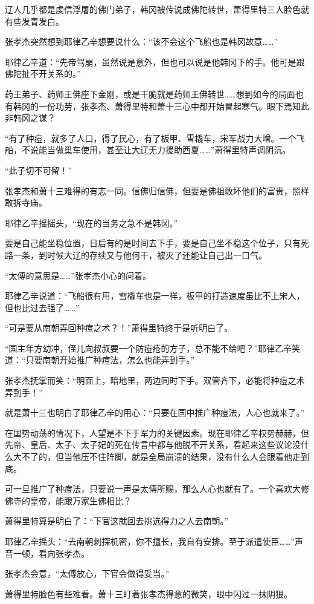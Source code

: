 辽人几乎都是虔信浮屠的佛门弟子，韩冈被传说成佛陀转世，萧得里特三人脸色就有些发青发白。

张孝杰突然想到耶律乙辛想要说什么：“该不会这个飞船也是韩冈故意……”

耶律乙辛道：“先帝驾崩，虽然说是意外，但也可以说是他韩冈下的手。他可是跟佛陀扯不开关系的。”

药王弟子、药师王佛座下金刚，或是干脆就是药师王佛转世……想到如今的局面也有韩冈的一份功劳，张孝杰、萧得里特和萧十三心中都开始冒起寒气。眼下焉知此非韩冈之谋？

“有了种痘，就多了人口，得了民心，有了板甲、雪橇车，宋军战力大增。一个飞船，不说能当做巢车使用，甚至让大辽无力援助西夏……”萧得里特声调阴沉。

“此子切不可留！”

张孝杰和萧十三难得的有志一同。信佛归信佛，但要是佛祖敢坏他们的富贵，照样敢拆寺庙。

耶律乙辛摇摇头，“现在的当务之急不是韩冈。”

要是自己能坐稳位置，日后有的是时间去下手，要是自己坐不稳这个位子，只有死路一条，到时候大辽的存续又与他何干，被灭了还能让自己出一口气。

“太傅的意思是……”张孝杰小心的问着。

耶律乙辛说道：“飞船很有用，雪橇车也是一样，板甲的打造速度虽比不上宋人，但也比过去强了……”

“可是要从南朝弄回种痘之术？！”萧得里特终于是听明白了。

“国主年方幼冲，侄儿向叔叔要一个防痘疮的方子，总不能不给吧？”耶律乙辛笑道：“只要南朝开始推广种痘法，怎么也能弄到手。”

张孝杰抚掌而笑：“明面上，暗地里，两边同时下手。双管齐下，必能将种痘之术弄到手！”

就是萧十三也明白了耶律乙辛的用心：“只要在国中推广种痘法，人心也就来了。”

在国势动荡的情况下，人望是不下于军力的关键因素。现在耶律乙辛权势赫赫，但先帝、皇后、太子、太子妃的死在传言中都与他脱不开关系，看起来这些议论没什么大不了的，但当他压不住阵脚，就是全局崩溃的结果，没有什么人会跟着他走到底。

可一旦推广了种痘法，只要说一声是太傅所赐，那么人心也就有了。一个喜欢大修佛寺的皇帝，能跟万家生佛相比？

萧得里特算是明白了：“下官这就回去挑选得力之人去南朝。”

耶律乙辛摇头：“去南朝刺探机密，你不擅长，我自有安排。至于派遣使臣……”声音一顿，看向张孝杰。

张孝杰会意，“太傅放心，下官会做得妥当。”

萧得里特脸色有些难看。萧十三盯着张孝杰得意的微笑，眼中闪过一抹阴狠。

